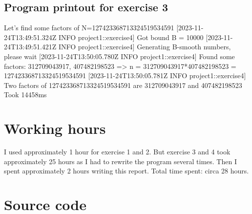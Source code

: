 \documentclass[12pt]{article}
\begin{document}
\subsection*{Program printout for exercise 3}
\begin{verbnobox} Let's find some factors of N=127423368713324519534591
[2023-11-24T13:49:51.324Z INFO  project1::exercise4] Got bound B = 10000
[2023-11-24T13:49:51.421Z INFO  project1::exercise4] Generating B-smooth numbers, please wait
[2023-11-24T13:50:05.780Z INFO  project1::exercise4] Found some factors: 312709043917, 407482198523 => n = 
    312709043917*407482198523 = 127423368713324519534591
[2023-11-24T13:50:05.781Z INFO  project1::exercise4] Two factors of 127423368713324519534591 are 
    312709043917 and 407482198523
Took 14458ms
\end{verbnobox}


\section*{Working hours}
I used approximately 1 hour for exercise 1 and 2. But exercise 3 and 4 took approximately 25 hours as I had to rewrite the program several times. Then I spent approximately 2 hours writing this report.
Total time spent: circa 28 hours.


\section*{Source code}



\newpage


\end{document}
